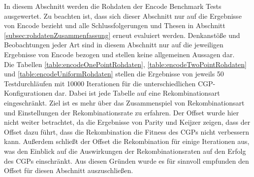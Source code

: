 In diesem Abschnitt werden die Rohdaten der Encode Benchmark Tests ausgewertet.
Zu beachten ist, dass sich dieser Abschnitt nur auf die Ergebnisse von Encode bezieht und alle Schlussfolgerungen und Thesen in Abschnitt \ref{subsec:rohdatenZusammenfassung} erneut evaluiert werden.
Denkanstöße und Beobachtungen jeder Art sind in diesem Abschnitt nur auf die jeweiligen Ergebnisse von Encode bezogen und stellen keine allgemeinen Aussagen dar.\\
Die Tabellen \ref{table:encodeOnePointRohdaten}, \ref{table:encodeTwoPointRohdaten} und \ref{table:encodeUniformRohdaten} stellen die Ergebnisse von jeweils 50 Testdurchläufen mit 10000 Iterationen für die unterschiedlichen CGP-Konfigurationen dar. 
Dabei ist jede Tabelle auf eine Rekombinationsart eingeschränkt.
Ziel ist es mehr über das Zusammenspiel von Rekombinationsart und Einstellungen der Rekombinationsrate zu erfahren.
Der Offset wurde hier nicht weiter betrachtet, da die Ergebnisse von Parity und Keijzer zeigen, dass der Offset dazu führt, dass die Rekombination die Fitness des CGPs nicht verbessern kann.
Außerdem schließt der Offset die Rekombination für einige Iterationen aus, was den Einblick auf die Auswirkungen der Rekombinationsraten auf den Erfolg des CGPs einschränkt.
Aus diesen Gründen wurde es für sinnvoll empfunden den Offset für diesen Abschnitt auszuschließen.


